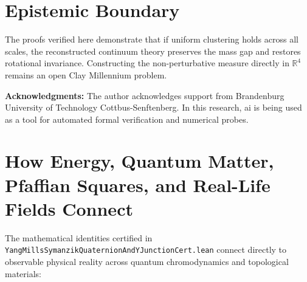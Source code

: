\documentclass[11pt,a4paper]{article}
\theoremstyle{definition}
\begin{document}
\section{Epistemic Boundary}

The proofs verified here demonstrate that if uniform clustering holds across all scales, the reconstructed continuum theory preserves the mass gap and restores rotational invariance. Constructing the non-perturbative measure directly in $\mathbb{R}^4$ remains an open Clay Millennium problem.

\vspace{1em}
\noindent\textbf{Acknowledgments:} The author acknowledges support from Brandenburg University of Technology Cottbus-Senftenberg. In this research, ai is being used as a tool for automated formal verification and numerical probes.


\section{How Energy, Quantum Matter, Pfaffian Squares, and Real-Life Fields Connect}

The mathematical identities certified in \texttt{YangMillsSymanzikQuaternionAndYJunctionCert.lean} connect directly to observable physical reality across quantum chromodynamics and topological materials:
\end{document}
